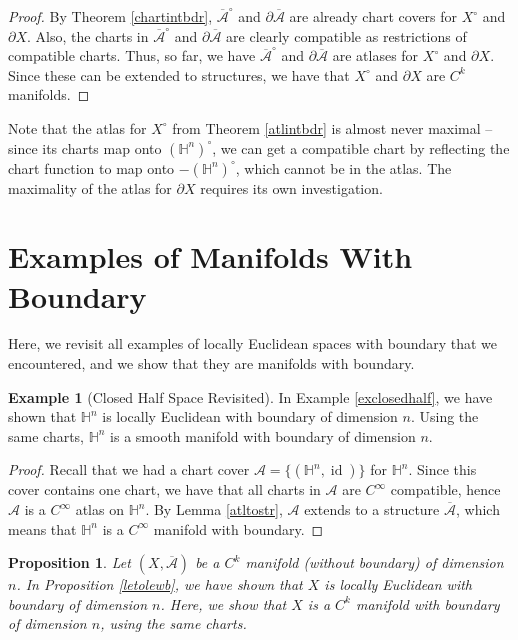 \documentclass{article}
\renewcommand{\H}{\mathbb{H}}
\newcommand{\cl}[1]{\overline{#1}}
\newcommand{\bdr}{\partial}
\newcommand{\id}{\operatorname{id}}
\newcommand{\atl}[1]{\mathcal{#1}}
\newcommand{\str}[1]{\cl{\atl{#1}}}
\theoremstyle{plain} %
\numberwithin{thm}{section} %
\newtheorem{prop}[thm]{Proposition}
\theoremstyle{definition} %
\newtheorem{example}[thm]{Example}
\begin{document}
\begin{proof}
By Theorem \ref{chartintbdr}, $\str{A}^\circ$ and $\bdr\str{A}$ are already chart covers for $X^\circ$ and $\bdr X$. Also, the charts in $\str{A}^\circ$ and $\bdr\str{A}$ are clearly compatible as restrictions of compatible charts. Thus, so far, we have $\str{A}^\circ$ and $\bdr\str{A}$ are atlases for $X^\circ$ and $\bdr X$. Since these can be extended to structures, we have that $X^\circ$ and $\bdr X$ are $C^k$ manifolds.
\end{proof}

Note that the atlas for $X^\circ$ from Theorem \ref{atlintbdr} is almost never maximal -- since its charts map onto $(\H^n)^\circ$, we can get a compatible chart by reflecting the chart function to map onto $-(\H^n)^\circ$, which cannot be in the atlas. The maximality of the atlas for $\bdr X$ requires its own investigation.

\section{Examples of Manifolds With Boundary}

Here, we revisit all examples of locally Euclidean spaces with boundary that we encountered, and we show that they are manifolds with boundary.

\begin{example}[Closed Half Space Revisited]
    In Example \ref{exclosedhalf}, we have shown that $\H^n$ is locally Euclidean with boundary of dimension $n$. Using the same charts, $\H^n$ is a smooth manifold with boundary of dimension $n$.
\end{example}

\begin{proof}
Recall that we had a chart cover $\atl{A} = \{(\H^n, \id)\}$ for $\H^n$. Since this cover contains one chart, we have that all charts in $\atl{A}$ are $C^\infty$ compatible, hence $\atl{A}$ is a $C^\infty$ atlas on $\H^n$. By Lemma \ref{atltostr}, $\atl{A}$ extends to a structure $\str{A}$, which means that $\H^n$ is a $C^\infty$ manifold with boundary.
\end{proof}

\begin{prop}
    Let $(X, \str{A})$ be a $C^k$ manifold (without boundary) of dimension $n$. In Proposition \ref{letolewb}, we have shown that $X$ is locally Euclidean with boundary of dimension $n$. Here, we show that $X$ is a $C^k$ manifold with boundary of dimension $n$, using the same charts.
\end{prop}
\end{document}
